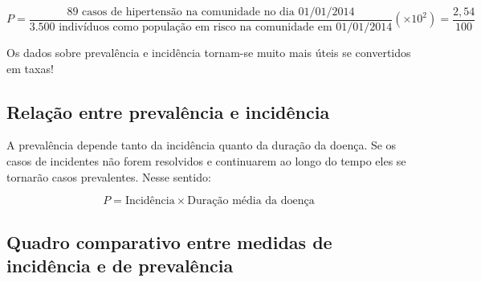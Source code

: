 \documentclass[
]{book}
\begin{document}
\[
P=\frac{\text{89 casos de hipertensão na comunidade no dia 01/01/2014}}{\text{3.500 indivíduos como população em risco na comunidade em 01/01/2014}} (\times 10^{2}) = \frac{2,54}{100 }
\]

\hfill\break

Os dados sobre prevalência e incidência tornam-se muito mais úteis se convertidos em taxas!

\hfill\break

\hypertarget{relauxe7uxe3o-entre-prevaluxeancia-e-inciduxeancia}{%
\subsection{Relação entre prevalência e incidência}\label{relauxe7uxe3o-entre-prevaluxeancia-e-inciduxeancia}}

\hfill\break

A prevalência depende tanto da incidência quanto da duração da doença. Se os casos de incidentes não forem resolvidos e continuarem ao longo do tempo eles se tornarão casos prevalentes. Nesse sentido:

\hfill\break

\[
P=\text{Incidência} \times \text{Duração média da doença}
\]

\hfill\break

\hypertarget{quadro-comparativo-entre-medidas-de-inciduxeancia-e-de-prevaluxeancia}{%
\subsection{Quadro comparativo entre medidas de incidência e de prevalência}\label{quadro-comparativo-entre-medidas-de-inciduxeancia-e-de-prevaluxeancia}}

\hfill\break
\end{document}
